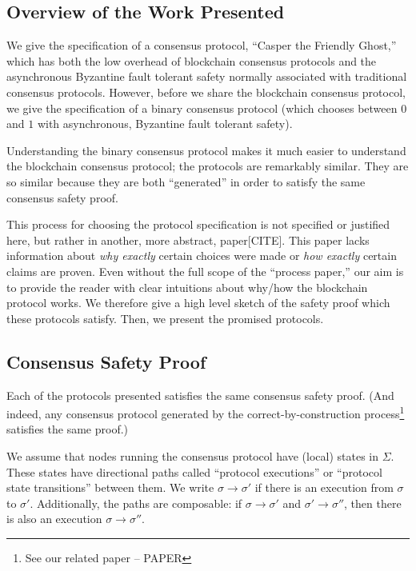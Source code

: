 \documentclass{article}
\theoremstyle{definition}
\begin{document}
\subsection{Overview of the Work Presented}

We give the specification of a consensus protocol, ``Casper the Friendly Ghost,'' which has both the low overhead of blockchain consensus protocols and the asynchronous Byzantine fault tolerant safety normally associated with traditional consensus protocols. However, before we share the blockchain consensus protocol, we give the specification of a binary consensus protocol (which chooses between $0$ and $1$ with asynchronous, Byzantine fault tolerant safety).

Understanding the binary consensus protocol makes it much easier to understand the blockchain consensus protocol; the protocols are remarkably similar. They are so similar because they are both ``generated'' in order to satisfy the same consensus safety proof.

This process for choosing the protocol specification is not specified or justified here, but rather in another, more abstract, paper[CITE]. This paper lacks information about \emph{why exactly} certain choices were made or \emph{how exactly} certain claims are proven. Even without the full scope of the ``process paper,'' our aim is to provide the reader with clear intuitions about why/how the blockchain protocol works. We therefore give a high level sketch of the safety proof which these protocols satisfy. Then, we present the promised protocols.

\subsection{Consensus Safety Proof}

Each of the protocols presented satisfies the same consensus safety proof. (And indeed, any consensus protocol generated by the correct-by-construction process\footnote{See our related paper -- PAPER} satisfies the same proof.)

We assume that nodes running the consensus protocol have (local) states in $\Sigma$. These states have directional paths called ``protocol executions'' or ``protocol state transitions'' between them. We write $\sigma \to \sigma'$ if there is an execution from $\sigma$ to $\sigma'$. Additionally, the paths are composable: if $\sigma \to \sigma'$ and $\sigma' \to \sigma''$, then there is also an execution $\sigma \to \sigma''$.
\end{document}
